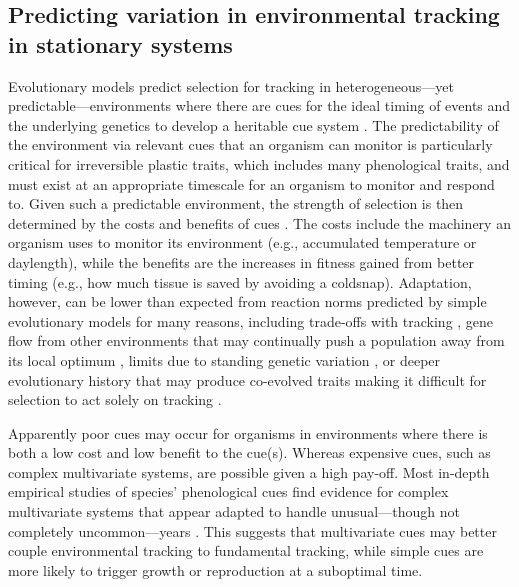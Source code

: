 \documentclass[11pt,letterpaper]{article}
\begin{document}
\subsection{Predicting variation in environmental tracking in stationary systems} 
Evolutionary models predict selection for tracking in heterogeneous---yet predictable---environments where there are cues for the ideal timing of events \citep{Piersma:2003wj,reed2010} and the underlying genetics to develop a heritable cue system \citep[tracking is likely strongly heritable, given that many cue systems are themselves heritable, e.g.,][]{vanAsch2007gcb,Wilczek:2010ad}. The predictability of the environment via relevant cues that an organism can monitor is particularly critical for irreversible plastic traits, which includes many phenological traits, and must exist at an appropriate timescale for an organism to monitor and respond to. Given such a predictable environment, the strength of selection is then determined by the costs and benefits of cues \citep{donahue2015}. The costs include the machinery an organism uses to monitor its environment (e.g., accumulated temperature or daylength), while the benefits are the increases in fitness gained from better timing (e.g., how much tissue is saved by avoiding a coldsnap).  Adaptation, however, can be lower than expected from reaction norms predicted by simple evolutionary models for many reasons, including trade-offs with tracking \citep{Singer:2010eb,Johansson2012}, gene flow from other environments that may continually push a population away from its local optimum \citep{lenormand2002}, limits due to standing genetic variation  \citep{Franks:2007wd,ghalambor2015}, or deeper evolutionary history that may produce co-evolved traits making it difficult for selection to act solely on tracking \citep{Ackerly:2009ly}. 

Apparently poor cues may occur for organisms in environments where there is both a low cost and low benefit to the cue(s). Whereas expensive cues, such as complex multivariate systems, are possible given a high pay-off. Most in-depth empirical studies of species' phenological cues find evidence for complex multivariate systems that appear adapted to handle unusual---though not completely uncommon---years \citep{chuinearees}.  This suggests that multivariate cues may better couple environmental tracking to fundamental tracking, while simple cues are more likely to trigger growth or reproduction at a suboptimal time.
\end{document}
